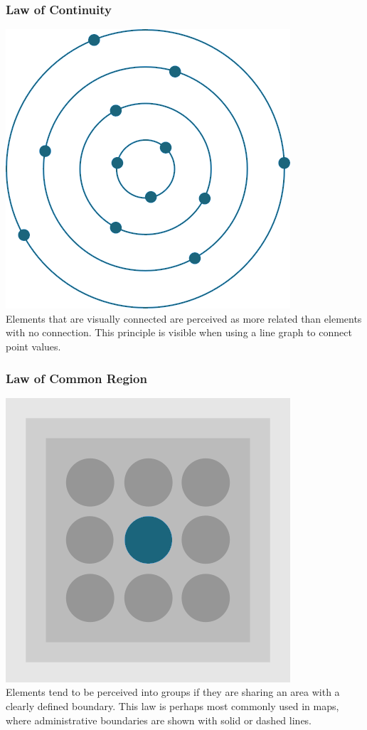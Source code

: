\documentclass[
  a4paper,
  onecolumn,
  oneside]{book}
\begin{document}
\hypertarget{law-of-continuity}{%
\subsubsection{Law of Continuity}\label{law-of-continuity}}

\includegraphics{part1/images/lawofcontinuity.png}\\
Elements that are visually connected are perceived as more related than
elements with no connection. This principle is visible when using a line
graph to connect point values.

\hypertarget{law-of-common-region}{%
\subsubsection{Law of Common Region}\label{law-of-common-region}}

\includegraphics{part1/images/lawofcommonregion.png}\\
Elements tend to be perceived into groups if they are sharing an area
with a clearly defined boundary. This law is perhaps most commonly used
in maps, where administrative boundaries are shown with solid or dashed
lines.
\end{document}
